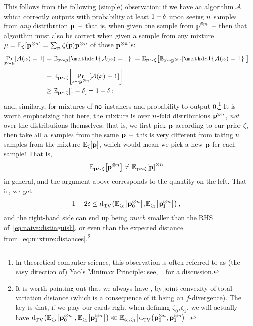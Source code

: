 This follows from the following (simple) observation: if we have an algorithm $\mathcal{A}$ which correctly outputs \accept with probability at least $1-\delta$ upon seeing $n$ samples from \emph{any} distribution $\mathbf{p}$~--~that is, when given one sample from $\mathbf{p}^{\otimes n}$~--~then that algorithm must also be correct when given a sample from any mixture $\mu = \bE{\zeta}{\p^{\otimes\ns}}=\sum_{\p}\zeta(\p)\p^{\otimes\ns}$ of those $\mathbf{p}^{\otimes n}$'s:
\begin{align*}
	\bP{x\sim\mu}{\Algo(x)=\accept}
	&= \bE{x\sim\mu}{\indic{\Algo(x)=\accept}}
	= \bE{\p\sim\zeta}{\bE{x\sim\p^{\otimes\ns}}{\indic{\Algo(x)=\accept}}}\\
	&= \bE{\p\sim\zeta}{\bP{x\sim\p^{\otimes\ns}}{\Algo(x)=\accept}}\\
	&\geq \bE{\p\sim\zeta}{1-\errprob} = 1-\errprob\;;
\end{align*}
and, similarly, for mixtures of ${\sf{}no}$-instances and probability to output $0$.\footnote{In theoretical computer science, this observation is often referred to as (the easy direction of) Yao's Minimax Principle: see, \eg~\citet[Appendix~A.1]{Goldreich:14} for a discussion.} It is worth emphasizing that here, the mixture is over $n$-fold distributions $\mathbf{p}^{\otimes n}$, \emph{not} over the distributions themselves: that is, we first pick $\mathbf{p}$ according to our prior $\zeta$, then take all $n$ samples from the same $\mathbf{p}$~--~this is very different from taking $n$ samples from the mixture $\bE{\zeta}{\p}$, which would mean we pick a new $\mathbf{p}$ for each sample! That is,
\begin{equation}
	\bE{\p\sim\zeta}{\p^{\otimes\ns}} \neq \bE{\p\sim\zeta}{\p}^{\otimes\ns}
\end{equation}
in general, and the argument above corresponds to the quantity on the left. That is, we get
\begin{equation}
	\label{eq:lecam}
	1-2\errprob \leq \totalvardist{\bE{\zeta_\reject}{\p_\reject^{\otimes\ns}}}{\bE{\zeta_\accept}{\p_\accept^{\otimes\ns}}}\,,
\end{equation}
and the right-hand side can end up being \emph{much} smaller than the RHS of~\cref{eq:naive:distinguish}, or even than the expected distance from~\cref{eq:mixture:distances}.\footnote{It is worth pointing out that we always have , by joint convexity of total variation distance (which is a consequence of it being an $f$-divergence). The key is that, if we play our cards right when defining $\zeta_0,\zeta_1$, we will actually have
$\totalvardist{\bE{\zeta_\reject}{\p_\reject^{\otimes\ns}}}{\bE{\zeta_\accept}{\p_\accept^{\otimes\ns}}} \ll \bE{\zeta_\reject,\zeta_\accept}{\totalvardist{\p_0^{\otimes\ns}}{\p_1^{\otimes\ns}}}$.}

